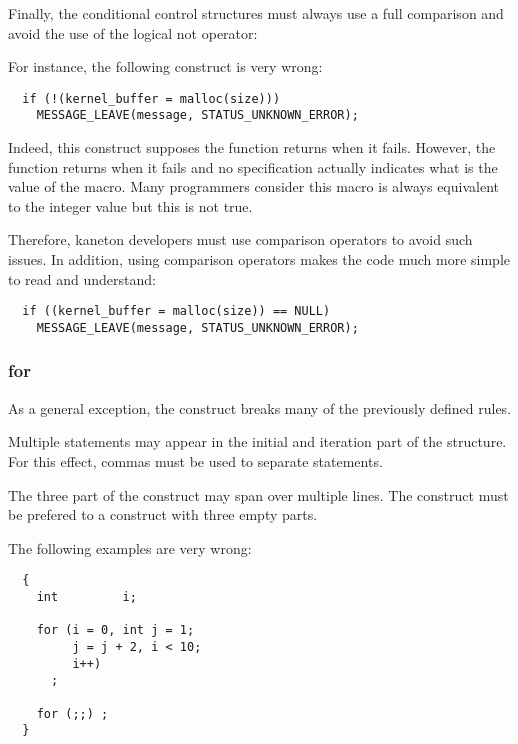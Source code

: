 Finally, the conditional control structures must always use a full
comparison and avoid the use of the logical not operator: \code{!}

For instance, the following construct is very wrong:

\begin{verbatim}
  if (!(kernel_buffer = malloc(size)))
    MESSAGE_LEAVE(message, STATUS_UNKNOWN_ERROR);
\end{verbatim}

Indeed, this construct supposes the  function returns
 when it fails. However, the  function returns
 when it fails and no specification actually indicates what
is the value of the  macro. Many programmers consider this
macro is always equivalent to the  integer value but this is
not true.

Therefore, kaneton developers must use comparison operators to avoid such
issues. In addition, using comparison operators makes the code much
more simple to read and understand:

\begin{verbatim}
  if ((kernel_buffer = malloc(size)) == NULL)
    MESSAGE_LEAVE(message, STATUS_UNKNOWN_ERROR);
\end{verbatim}


\subsubsection{for}

As a general exception, the  construct breaks many of the
previously defined rules.

Multiple statements may appear in the initial and iteration part of the
 structure. For this effect, commas must be used to separate
statements.

The three part of the  construct may span over multiple lines. The
 construct must be prefered to a  construct with
three empty parts.

The following examples are very wrong:

\begin{verbatim}
  {
    int         i;

    for (i = 0, int j = 1;
         j = j + 2, i < 10;
         i++)
      ;

    for (;;) ;
  }
\end{verbatim}


